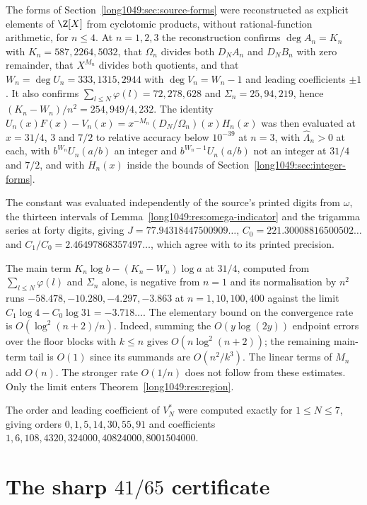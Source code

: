The forms of Section~\ref{long1049:sec:source-forms} were reconstructed as explicit
elements of $\Z[X]$ from cyclotomic products, without rational-function
arithmetic, for $n\le4$.  At $n=1,2,3$ the reconstruction confirms
$\deg A_n=K_n$ with $K_n=587,2264,5032$, that $\Omega_n$ divides both $D_NA_n$
and $D_NB_n$ with zero remainder, that $X^{M_n}$ divides both quotients, and
that $W_n=\deg U_n=333,1315,2944$ with $\deg V_n=W_n-1$ and leading
coefficients $\pm1$.  It also confirms
$\sum_{l\le N}\varphi(l)=72,278,628$ and $\Sigma_n=25,94,219$, hence
$(K_n-W_n)/n^{2}=254,949/4,232$.  The identity
$U_n(x)F(x)-V_n(x)=x^{-M_n}(D_N/\Omega_n)(x)H_n(x)$ was then evaluated at
$x=31/4$, $3$ and $7/2$ to relative accuracy below $10^{-39}$ at $n=3$, with
$\widehat\Lambda_n>0$ at each, with $b^{W_n}U_n(a/b)$ an integer and
$b^{W_n-1}U_n(a/b)$ not an integer at $31/4$ and $7/2$, and with $H_n(x)$
inside the bounds of Section~\ref{long1049:sec:integer-forms}.

The constant was evaluated independently of the source's printed digits from
$\omega$, the thirteen intervals of Lemma~\ref{long1049:res:omega-indicator} and the
trigamma series at forty digits, giving
$J=77.94318447500909\ldots$, $C_0=221.30008816500502\ldots$ and
$C_1/C_0=2.46497868357497\ldots$, which agree with
\cite[p.~162]{zudilin2004} to its printed precision.

The main term $K_n\log b-(K_n-W_n)\log a$ at $31/4$, computed from
$\sum_{l\le N}\varphi(l)$ and $\Sigma_n$ alone, is negative from $n=1$ and its
normalisation by $n^{2}$ runs $-58.478,-10.280,-4.297,-3.863$ at
$n=1,10,100,400$ against the limit $C_1\log4-C_0\log31=-3.718\ldots$.  The
elementary bound on the convergence rate is $O(\log^2(n+2)/n)$.
Indeed, summing the $O(y\log(2y))$ endpoint errors over the floor blocks
with $k\le n$ gives $O(n\log^2(n+2))$; the remaining main-term tail is
$O(1)$ since its summands are $O(n^2/k^3)$.  The linear terms of $M_n$
add $O(n)$.  The stronger rate $O(1/n)$ does not follow from these estimates.  Only the limit enters Theorem~\ref{long1049:res:region}.

The order and leading coefficient of $V_N^{*}$ were computed exactly for
$1\le N\le7$, giving orders $0,1,5,14,30,55,91$ and coefficients
$1,6,108,4320,324000,40824000,8001504000$.

\section{The sharp $41/65$ certificate}\label{long1049:sec:sharp}

